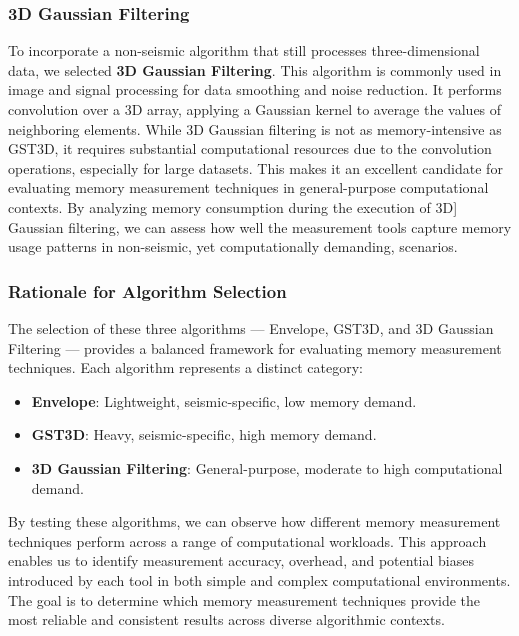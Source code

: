 
\subsubsection{3D Gaussian Filtering}

To incorporate a non-seismic algorithm that still processes three-dimensional data, we selected \textbf{\ac{3D} Gaussian Filtering}.
This algorithm is commonly used in image and signal processing for data smoothing and noise reduction.
It performs convolution over a \ac{3D} array, applying a Gaussian kernel to average the values of neighboring elements.
While \ac{3D} Gaussian filtering is not as memory-intensive as \ac{GST3D}, it requires substantial computational resources due to the convolution operations, especially for large datasets.
This makes it an excellent candidate for evaluating memory measurement techniques in general-purpose computational contexts.
By analyzing memory consumption during the execution of \ac{3D]} Gaussian filtering, we can assess how well the measurement tools capture memory usage patterns in non-seismic, yet computationally demanding, scenarios.


\subsubsection{Rationale for Algorithm Selection}

The selection of these three algorithms — Envelope, \ac{GST3D}, and \ac{3D} Gaussian Filtering — provides a balanced framework for evaluating memory measurement techniques.
Each algorithm represents a distinct category:

\begin{itemize}
    \item \textbf{Envelope}: Lightweight, seismic-specific, low memory demand.
    \item \textbf{\ac{GST3D}}: Heavy, seismic-specific, high memory demand.
    \item \textbf{\ac{3D} Gaussian Filtering}: General-purpose, moderate to high computational demand.
\end{itemize}

By testing these algorithms, we can observe how different memory measurement techniques perform across a range of computational workloads.
This approach enables us to identify measurement accuracy, overhead, and potential biases introduced by each tool in both simple and complex computational environments.
The goal is to determine which memory measurement techniques provide the most reliable and consistent results across diverse algorithmic contexts.

